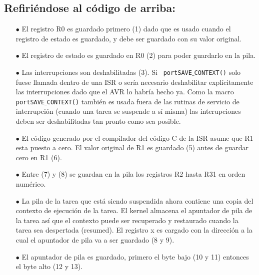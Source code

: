 \documentclass[12pt]{article}
\begin{document}
\subsection*{Refiriéndose al código de arriba:}
\begin{itemize}
\item[$\bullet$] El registro R0 es guardado primero (1) dado que es usado 
cuando el registro de estado es guardado, y debe ser guardado con su 
valor original.
\item[$\bullet$] El registro de estado es guardado en R0 (2) para poder 
guardarlo en la pila.
\item[$\bullet$] Las interrupciones son deshabilitadas (3). Si {\tt 
portSAVE$\_$CONTEXT()} solo fuese llamada dentro de una ISR o sería 
necesario deshabilitar explícitamente las interrupciones dado que el AVR 
lo habría hecho ya. Como la macro {\tt portSAVE$\_$CONTEXT()} también es 
usada fuera de las rutinas de servicio de interrupción (cuando una tarea 
se suspende a sí misma) las interupciones deben ser deshabilitadas tan 
pronto como sea posible. 
\item[$\bullet$] El código generado por el compilador del código C de la 
ISR asume que R1 esta puesto a cero. El valor original de R1 es guardado 
(5) antes de guardar cero en R1 (6).
\item[$\bullet$] Entre (7) y (8) se guardan en la pila los registros R2 
hasta R31 en orden numérico.
\item[$\bullet$] La pila de la tarea que está siendo suspendida ahora 
contiene una copia del contexto de ejecución de la tarea. El kernel 
almacena el apuntador de pila de la tarea así que el contexto puede ser 
recuperado y restaurado cuando la tarea sea despertada (resumed). El 
registro x es cargado con la dirección a la cual el apuntador de pila 
va a ser guardado (8 y 9).
\item[$\bullet$] El apuntador de pila es guardado, primero el byte bajo 
(10 y 11) entonces el byte alto (12 y 13).
\end{itemize}
\end{document}
